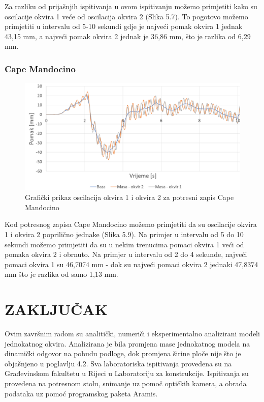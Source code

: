 \documentclass[12pt]{book}
\begin{document}
Za razliku od prijašnjih ispitivanja u ovom ispitivanju možemo primjetiti kako su oscilacije okvira 1 veće od oscilacija okvira 2 (Slika 5.7). To pogotovo možemo primjetiti u intervalu od 5-10 sekundi gdje je najveći pomak okvira 1 jednak 43,15 mm, a najveći pomak okvira 2 jednak je 36,86 mm, što je razlika od 6,29 mm.

\newpage

\subsection{Cape Mandocino}

\begin{figure}[H]
	\centering
	\includegraphics[width=1\linewidth]{Slike/cape_mandocino_graf}
	\caption{Grafički prikaz oscilacija okvira 1 i okvira 2 za potresni zapis Cape Mandocino}
	\label{fig:capemandocinograf}
\end{figure}

Kod potresnog zapisa Cape Mandocino možemo primjetiti da su oscilacije okvira 1 i okvira 2 poprilično jednake (Slika 5.9). Na primjer u intervalu od 5 do 10 sekundi možemo primjetiti da su u nekim trenucima pomaci okvira 1 veći od pomaka okvira 2 i obrnuto. Na primjer u intervalu od 2 do 4 sekunde, najveći pomaci okvira 1 su 46,7074 mm - dok su najveći pomaci okvira 2 jednaki 47,8374 mm što je razlika od samo 1,13 mm.

\chapter{\uppercase{ZakljuČak}}

Ovim završnim radom su analitički, numeriči i eksperimentalno analizirani modeli jednokatnog okvira. Analizirana je bila promjena mase jednokatnog modela na dinamički odgovor na pobudu podloge, dok promjena širine ploče nije što je objašnjeno u poglavlju 4.2. Sva laboratoriska ispitivanja provedena su na Građevinskom fakultetu u Rijeci u Laboratoriju za konstrukcije. Ispitivanja su provedena na potresnom stolu, snimanje uz pomoč optičkih kamera, a obrada podataka uz pomoć programskog paketa Aramis.
\end{document}
